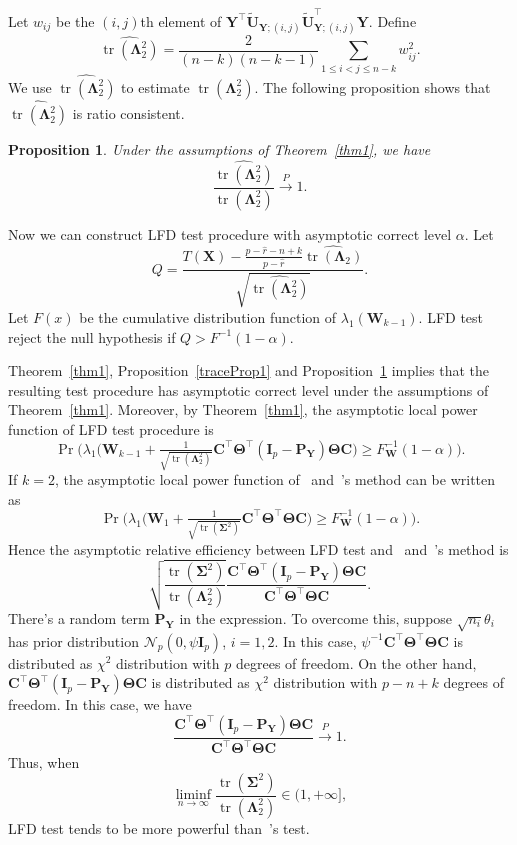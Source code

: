 \documentclass[12pt]{article} %
\DeclareMathOperator{\mytr}{tr}
\newcommand{\bX}{\mathbf{X}}
\newcommand{\bP}{\mathbf{P}}
\newcommand{\bY}{\mathbf{Y}}
\newcommand{\bC}{\mathbf{C}}
\newcommand{\bI}{\mathbf{I}}
\newcommand{\bU}{\mathbf{U}}
\newcommand{\bW}{\mathbf{W}}
\newcommand{\bfsym}[1]{\ensuremath{\boldsymbol{#1}}}
\def\bLambda {\bfsym {\Lambda}}
\def\bSigma {\bfsym {\Sigma}}
\def\bTheta {\bfsym {\Theta}}
\newtheorem{proposition}{Proposition}
\theoremstyle{definition}
\begin{document}
    Let $w_{ij}$ be the $(i,j)$th element of $\bY^\top \tilde{\bU}_{\bY;(i,j)} \tilde{\bU}_{\bY;(i,j)}^\top \bY$.
    Define
    $$
    \widehat{\mytr(\bLambda_2^2)}=\frac{2}{(n-k)(n-k-1)}\sum_{1\leq i<j\leq n-k}w_{ij}^2.
    $$
    We use $\widehat{\mytr(\bLambda_2^2)}$ to estimate $\mytr(\bLambda_2^2)$.
    The following proposition shows that $\widehat{\mytr(\bLambda_2^2)}$ is  ratio consistent.
    \begin{proposition}\label{Taichangle}
        Under the assumptions of Theorem~\ref{thm1}, we have
        $$
        \frac{\widehat{\mytr(\bLambda^2_2)}}{\mytr(\bLambda^2_2)} \xrightarrow{P} 1.
        $$

    \end{proposition}


Now we can construct LFD test procedure with asymptotic correct level $\alpha$. Let 
$$
Q=\frac{T(\bX)-\frac{p-\hat{r}-n+k}{p-\hat{r}}\widehat{\mytr(\bLambda_2)}}{\sqrt{\widehat{\mytr(\bLambda_2^2)}}}.
$$
Let $F(x)$ be the cumulative distribution function of $\lambda_{1}(\bW_{k-1})$.
LFD test reject the null hypothesis if $Q> F^{-1}(1-\alpha)$.

Theorem~\ref{thm1}, Proposition~\ref{traceProp1} and Proposition~\ref{Taichangle} implies that the resulting test procedure has asymptotic correct level under the assumptions of Theorem~\ref{thm1}.
Moreover, by Theorem~\ref{thm1}, the asymptotic local power function of LFD test procedure is
$$
\Pr\Big(
        \lambda_{1}\big(\bW_{k-1}+\tfrac{1}{\sqrt{\mytr(\bLambda_2^2)}} \bC^\top \bTheta^\top (\bI_p-\bP_{\bY})\bTheta \bC\big)\geq F_{\bW}^{-1}(1-\alpha)
\Big).
$$
If $k=2$, the asymptotic local power function of~\cite{Bai1996Efiect} and~\cite{Chen2010A}'s method can be written as
$$
\Pr\Big(
        \lambda_{1}\big(\bW_{1}+\tfrac{1}{\sqrt{\mytr(\bSigma^2)}} \bC^\top \bTheta^\top \bTheta \bC\big)\geq F_{\bW}^{-1}(1-\alpha)
\Big).
$$
Hence the asymptotic relative efficiency between LFD test and~\cite{Bai1996Efiect} and~\cite{Chen2010A}'s method is
$$
 \sqrt{\frac{{{\mytr(\bSigma^2)}}}{{\mytr(\bLambda_2^2)}}}
\frac{ \bC^\top \bTheta^\top (\bI_p-\bP_{\bY})\bTheta \bC}{ {\bC^\top \bTheta^\top \bTheta \bC}}.
$$
There's a random term $\bP_{\bY}$ in the expression.
To overcome this,
suppose $\sqrt{n_i} \theta_i$ has prior distribution $\mathcal{N}_p(0,\psi \bI_p)$, $i=1,2$.
In this case,
$
\psi^{-1}\bC^\top \bTheta^\top \bTheta \bC$
is distributed as $\chi^2$ distribution with $p$ degrees of freedom.
On the other hand,
$\bC^\top \bTheta^\top (\bI_p-\bP_{\bY})\bTheta \bC$  is distributed as 
$\chi^2$ distribution with $p-n+k$ degrees of freedom.
In this case, we have
$$
\frac{\bC^\top \bTheta^\top (\bI_p-\bP_{\bY})\bTheta \bC}{\bC^\top \bTheta^\top \bTheta \bC}\xrightarrow{P}1.
$$
Thus, when
$$
\liminf_{n\to \infty}\frac{{{\mytr(\bSigma^2)}}}{{\mytr(\bLambda_2^2)}}\in(1,+\infty],
$$
LFD test tends to be more powerful than~\cite{Chen2010A}'s test.
\end{document}
